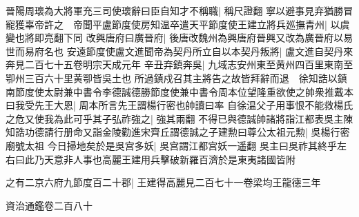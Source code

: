 晉陽周瓌為大將軍充三司使瓌辭曰臣自知才不稱職|{
	稱尺證翻}
寧以避事見弃猶勝冒寵獲辜帝許之　帝聞平盧節度使房知温卒遣天平節度使王建立將兵廵撫青州|{
	以虞變也將即亮翻下同}
改興唐府曰廣晉府|{
	後唐改魏州為興唐府晉興又改為廣晉府以易世而易府名也}
安遠節度使盧文進聞帝為契丹所立自以本契丹叛將|{
	盧文進自契丹來奔見二百七十五卷明宗天成元年}
辛丑弃鎮奔吳|{
	九域志安州東至黄州四百里東南至卾州三百六十里黄卾皆吳土也}
所過鎮戍召其主將告之故皆拜辭而退　徐知誥以鎮南節度使太尉兼中書令李德誠德勝節度使兼中書令周本位望隆重欲使之帥衆推戴本曰我受先王大恩|{
	周本所言先王謂楊行密也帥讀曰率}
自徐温父子用事恨不能救楊氏之危又使我為此可乎其子弘祚強之|{
	強其兩翻}
不得已與德誠帥諸將詣江都表吳主陳知誥功德請行册命又詣金陵勸進宋齊丘謂德誠之子建勲曰尊公太祖元勲|{
	吳楊行密廟號太祖}
今日掃地矣於是吳宫多妖|{
	吳宫謂江都宫妖一遥翻}
吳主曰吳祚其終乎左右曰此乃天意非人事也高麗王建用兵擊破新羅百濟於是東夷諸國皆附

之有二京六府九節度百二十郡|{
	王建得高麗見二百七十一卷梁均王龍德三年}


資治通鑑卷二百八十
